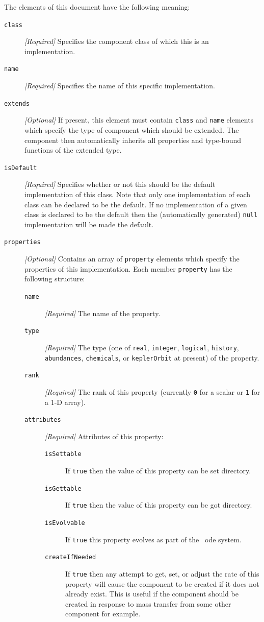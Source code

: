 The elements of this document have the following meaning:
\begin{description}
\item [{\tt class}] \emph{[Required]} Specifies the component class of which this is an implementation.
\item [{\tt name}] \emph{[Required]} Specifies the name of this specific implementation.
\item [{\tt extends}] \emph{[Optional]} If present, this element must contain {\tt class} and {\tt name} elements which specify the type of component which should be extended. The component then automatically inherits all properties and type-bound functions of the extended type.
\item [{\tt isDefault}] \emph{[Required]} Specifies whether or not this should be the default implementation of this class. Note that only one implementation of each class can be declared to be the default. If no implementation of a given class is declared to be the default then the (automatically generated) {\tt null} implementation will be made the default.
\item [{\tt properties}] \emph{[Optional]} Contains an array of {\tt property} elements which specify the properties of this implementation. Each member {\tt property} has the following structure:
\begin{description}
\item [{\tt name}] \emph{[Required]} The name of the property. 
\item [{\tt type}] \emph{[Required]} The type (one of {\tt real}, {\tt integer}, {\tt logical}, {\tt history}, {\tt abundances}, {\tt chemicals}, or {\tt keplerOrbit} at present) of the property.
\item [{\tt rank}] \emph{[Required]} The rank of this property (currently {\tt 0} for a scalar or {\tt 1} for a 1-D array).
\item [{\tt attributes}] \emph{[Required]} Attributes of this property:
\begin{description}
\item [{\tt isSettable}] If {\tt true} then the value of this property can be set directory.
\item [{\tt isGettable}] If {\tt true} then the value of this property can be got directory.
\item [{\tt isEvolvable}] If {\tt true} this property evolves as part of the \glc\ \gls{ode} system.
\item [{\tt createIfNeeded}] If {\tt true} then any attempt to get, set, or adjust the rate of this property will cause the component to be created if it does not already exist. This is useful if the component should be created in response to mass transfer from some other component for example.

\end{description}
\end{description}
\end{description}
